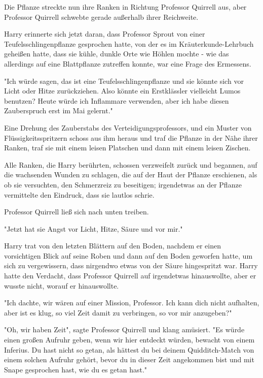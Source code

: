 {Die Pflanze streckte nun ihre Ranken in Richtung Professor Quirrell aus, aber Professor Quirrell schwebte gerade außerhalb ihrer Reichweite.

Harry erinnerte sich jetzt daran, dass Professor Sprout von einer Teufelsschlingenpflanze gesprochen hatte, von der es im Kräuterkunde-Lehrbuch geheißen hatte, dass sie kühle, dunkle Orte wie Höhlen mochte - wie das allerdings auf eine Blattpflanze zutreffen konnte, war eine Frage des Ermessens.

"Ich würde sagen, das ist eine Teufelsschlingenpflanze und sie könnte sich vor Licht oder Hitze zurückziehen. Also könnte ein Erstklässler vielleicht Lumos benutzen? Heute würde ich Inflammare verwenden, aber ich habe diesen Zauberspruch erst im Mai gelernt."

Eine Drehung des Zauberstabs des Verteidigungsprofessors, und ein Muster von Flüssigkeitsspritzern schoss aus ihm heraus und traf die Pflanze in der Nähe ihrer Ranken, traf sie mit einem leisen Platschen und dann mit einem leisen Zischen.

Alle Ranken, die Harry berührten, schossen verzweifelt zurück und begannen, auf die wachsenden Wunden zu schlagen, die auf der Haut der Pflanze erschienen, als ob sie versuchten, den Schmerzreiz zu beseitigen; irgendetwas an der Pflanze vermittelte den Eindruck, dass sie lautlos schrie.

Professor Quirrell ließ sich nach unten treiben.

"Jetzt hat sie Angst vor Licht, Hitze, Säure und vor mir."

Harry trat von den letzten Blättern auf den Boden, nachdem er einen vorsichtigen Blick auf seine Roben und dann auf den Boden geworfen hatte, um sich zu vergewissern, dass nirgendwo etwas von der Säure hingespritzt war. Harry hatte den Verdacht, dass Professor Quirrell auf irgendetwas hinauswollte, aber er wusste nicht, worauf er hinauswollte.

"Ich dachte, wir wären auf einer Mission, Professor. Ich kann dich nicht aufhalten, aber ist es klug, so viel Zeit damit zu verbringen, so vor mir anzugeben?"

"Oh, wir haben Zeit", sagte Professor Quirrell und klang amüsiert. "Es würde einen großen Aufruhr geben, wenn wir hier entdeckt würden, bewacht von einem Inferius. Du hast nicht so getan, als hättest du bei deinem Quidditch-Match von einem solchen Aufruhr gehört, bevor du in dieser Zeit angekommen bist und mit Snape gesprochen hast, wie du es getan hast."

}

